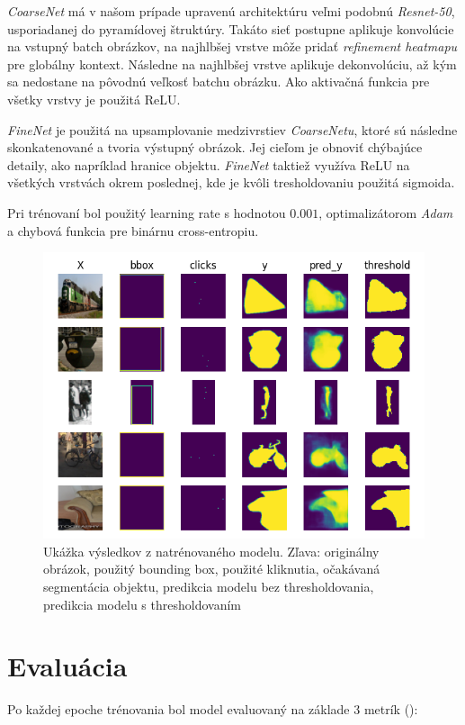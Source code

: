 \documentclass [11pt, a4paper, twocolumn]{article}
\begin{document}
\textit{CoarseNet} má v našom prípade upravenú architektúru veľmi podobnú \textit{Resnet-50}, usporiadanej do pyramídovej štruktúry. Takáto sieť postupne aplikuje konvolúcie na vstupný batch obrázkov, na najhlbšej vrstve môže pridať \textit{refinement heatmapu} pre globálny kontext. Následne na najhlbšej vrstve aplikuje dekonvolúciu, až kým sa nedostane na pôvodnú veľkosť batchu obrázku. Ako aktivačná funkcia pre všetky vrstvy je použitá ReLU.

\textit{FineNet} je použitá na upsamplovanie medzivrstiev \textit{CoarseNetu}, ktoré sú následne skonkatenované a tvoria výstupný obrázok. Jej cieľom je obnoviť chýbajúce detaily, ako napríklad hranice objektu. \textit{FineNet} taktiež využíva ReLU na všetkých vrstvách okrem poslednej, kde je kvôli tresholdovaniu použitá sigmoida.

Pri trénovaní bol použitý learning rate s hodnotou $0.001$, optimalizátorom \textit{Adam} a chybová funkcia pre binárnu cross-entropiu.

\begin{figure}[H]
\centering
\includegraphics[width=\linewidth]{results}
\caption{Ukážka výsledkov z natrénovaného modelu. Zľava: originálny obrázok, použitý bounding box, použité kliknutia, očakávaná segmentácia objektu, predikcia modelu bez thresholdovania, predikcia modelu s thresholdovaním}
\end{figure}

\section{Evaluácia}
Po každej epoche trénovania bol model evaluovaný na základe 3 metrík (\cite{tiu_2020}):
\end{document}
